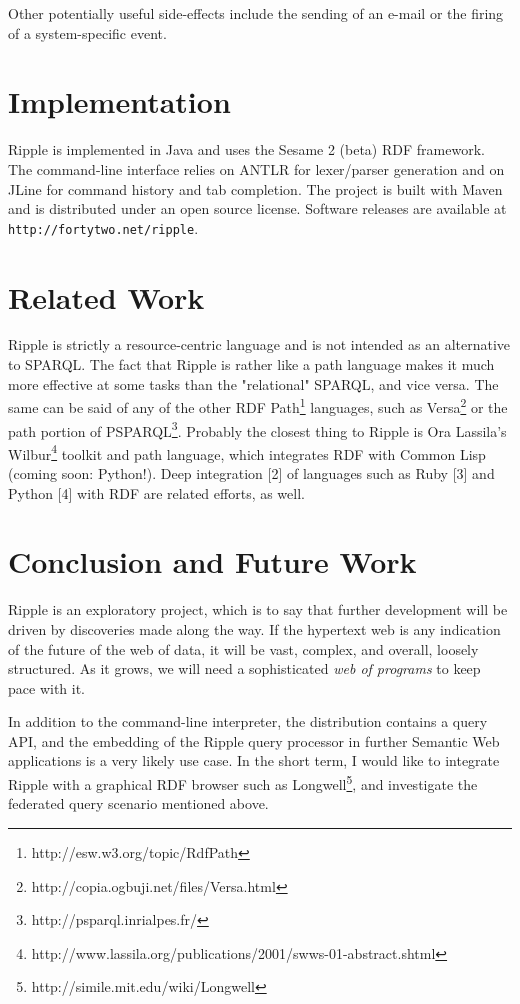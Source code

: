 \documentclass[runningheads]{llncs}
\begin{document}
Other potentially useful side-effects include the sending of an e-mail or the firing of a system-specific event.


\section{Implementation}
Ripple is implemented in Java and uses the Sesame 2 (beta) RDF framework.  The command-line interface relies on ANTLR for lexer/parser generation and on JLine for command history and tab completion.  The project is built with Maven and is distributed under an open source license.  Software releases are available at \texttt{http://fortytwo.net/ripple}.

\section{Related Work}
Ripple is strictly a resource-centric language and is not intended as an alternative to SPARQL.  The fact that Ripple is rather like a path language makes it much more effective at some tasks than the "relational" SPARQL, and vice versa.  The same can be said of any of the other RDF Path\footnote{http://esw.w3.org/topic/RdfPath} languages, such as Versa\footnote{http://copia.ogbuji.net/files/Versa.html} or the path portion of PSPARQL\footnote{http://psparql.inrialpes.fr/}.  Probably the closest thing to Ripple is Ora Lassila's Wilbur\footnote{http://www.lassila.org/publications/2001/swws-01-abstract.shtml} toolkit and path language, which integrates RDF with Common Lisp (coming soon: Python!).  Deep integration [2] of languages such as Ruby [3] and Python [4] with RDF are related efforts, as well.

\section{Conclusion and Future Work}
Ripple is an exploratory project, which is to say that further development will be driven by discoveries made along the way.  If the hypertext web is any indication of the future of the web of data, it will be vast, complex, and overall, loosely structured.  As it grows, we will need a sophisticated \textit{web of programs} to keep pace with it.

In addition to the command-line interpreter, the distribution contains a query API, and the embedding of the Ripple query processor in further Semantic Web applications is a very likely use case.  In the short term, I would like to integrate Ripple with a graphical RDF browser such as Longwell\footnote{http://simile.mit.edu/wiki/Longwell}, and investigate the federated query scenario mentioned above.
\end{document}
